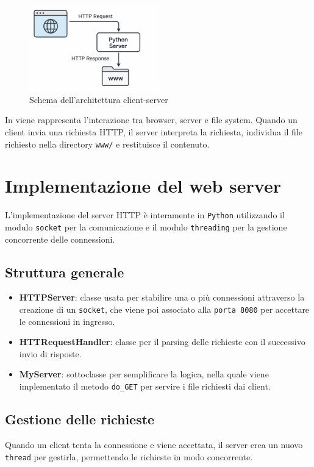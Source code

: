 \documentclass[a4paper,12pt]{report}
\begin{document}
\begin{figure}[H]
    \centering
    \includegraphics[width=0.5\textwidth]{img/architettura.png}
    \caption{Schema dell'architettura client-server}
    \label{fig:architettura}
\end{figure}

In  viene rappresenta l'interazione tra browser, server e file system. Quando un client
invia una richiesta HTTP, il server interpreta la richiesta, individua il file richiesto nella directory \texttt{www/}
e restituisce il contenuto.


\chapter{Implementazione del web server}
L'implementazione del server HTTP è interamente in \texttt{Python} utilizzando il modulo \texttt{socket} per
la comunicazione e il modulo \texttt{threading} per la gestione concorrente delle connessioni.

\section{Struttura generale}
\begin{itemize}
    \item \textbf{HTTPServer}: classe usata per stabilire una o più connessioni \newline attraverso la creazione di
          un \texttt{socket}, che viene poi associato alla \texttt{porta 8080} per accettare le connessioni in ingresso.
    \item \textbf{HTTRequestHandler}: classe per il parsing delle richieste con il successivo invio di risposte.
    \item \textbf{MyServer}: sottoclasse per semplificare la logica, nella quale viene implementato il
          metodo \texttt{do\_GET} per servire i file richiesti dai client.
\end{itemize}


\section{Gestione delle richieste}
Quando un client tenta la connessione e viene accettata, il server crea un nuovo \texttt{thread} per gestirla, permettendo
le richieste in modo concorrente.
\end{document}
